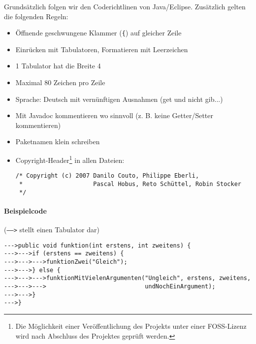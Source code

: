 \documentclass[a4paper,12pt,halfparskip,DIV14]{scrartcl}
\begin{document}
Grundsätzlich folgen wir den Coderichtlinen von Java/Eclipse. Zusätzlich gelten die folgenden Regeln:

\begin{itemize}
  \item Öffnende geschwungene Klammer (\texttt{\{}) auf gleicher Zeile
  \item Einrücken mit Tabulatoren, Formatieren mit Leerzeichen
  \item 1 Tabulator hat die Breite 4
  \item Maximal 80 Zeichen pro Zeile
  \item Sprache: Deutsch mit vernünftigen Ausnahmen (get und nicht gib...)
  \item Mit Javadoc kommentieren wo sinnvoll (z. B. keine Getter/Setter kommentieren)
  \item Paketnamen klein schreiben
  \item Copyright-Header\footnote{Die Möglichkeit einer Veröffentlichung des Projekts unter einer FOSS-Lizenz wird nach Abschluss des Projektes geprüft werden.} in allen Dateien:
    \begin{verbatim}
/* Copyright (c) 2007 Danilo Couto, Philippe Eberli,
 *                    Pascal Hobus, Reto Schüttel, Robin Stocker
 */
    \end{verbatim}
\end{itemize}


\paragraph{Beispielcode} (\texttt{----->} stellt einen Tabulator dar)

\begin{verbatim}
--->public void funktion(int erstens, int zweitens) {
--->--->if (erstens == zweitens) {
--->--->--->funktionZwei("Gleich");
--->--->} else {
--->--->--->funktionMitVielenArgumenten("Ungleich", erstens, zweitens,
--->--->--->                            undNochEinArgument);
--->--->}
--->}
\end{verbatim}
\end{document}
